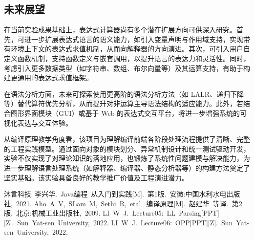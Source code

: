 \documentclass[a4paper, twoside, utf8]{ctexart}
\begin{document}
    \subsection{未来展望}

    在当前实验成果基础上，表达式计算器尚有多个潜在扩展方向可供深入研究。首先，可进一步扩展表达式语言的语义能力，如引入变量声明与作用域支持，实现带有环境上下文的表达式求值机制，从而向解释器的方向演进。其次，可引入用户自定义函数机制，支持函数定义与嵌套调用，以提升语言的表达力和灵活性。同时，考虑引入更多数据类型（如字符串、数组、布尔向量等）及其运算支持，有助于构建更通用的表达式求值框架。

    在语法分析方面，未来可探索使用更高阶的语法分析方法（如 LALR、递归下降等）替代算符优先分析，从而提升对非运算主导语法结构的适应能力。此外，若结合图形界面模块（GUI）或基于 Web 的表达式交互平台，将进一步增强系统的可视化表达与交互体验。

    从编译原理教学角度看，该项目为理解编译前端各阶段处理流程提供了清晰、完整的工程实践模型。通过面向对象的模块划分、异常机制设计和统一测试驱动开发，实验不仅实现了对理论知识的落地应用，也锻炼了系统性问题建模与解决能力，为进一步理解语言处理系统（如解释器、编译器、静态分析器等）的构建方法奠定了坚实基础。该实验具备良好的教学推广价值及工程演进潜力。
	
    \begin{thebibliography}{99}
         沐言科技\ 李兴华.\ Java编程\ 从入门到实践[M].\ 第1版.\ 安徽:中国水利水电出版社,\ 2021.
         Aho\ A\ V,\ SLam\ M,\ Sethi\ R,\ etal.\ 编译原理[M].\ 赵建华\ 等译.\ 第2版.\ 北京:机械工业出版社,\ 2009.
         LI\ W\ J.\ Lecture05:\ LL\ Parsing[PPT][Z].\ Sun\ Yat-sen\ University,\ 2022.
         LI\ W\ J.\ Lecture06:\ OPP[PPT][Z].\ Sun\ Yat-sen\ University,\ 2022.
    \end{thebibliography}
	
\end{document}
